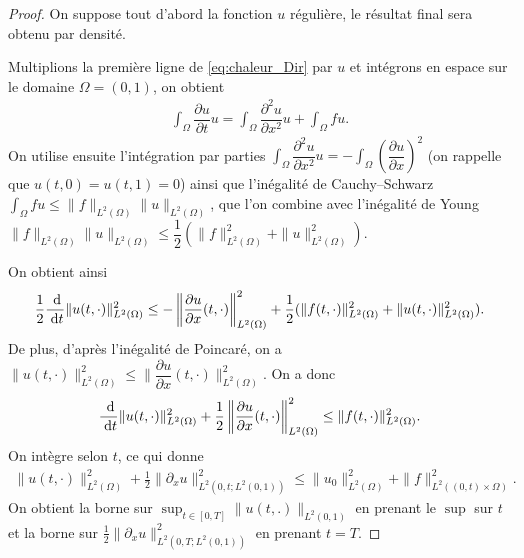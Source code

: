 \documentclass[12pt,a4paper,twoside]{article}
\begin{document}
\begin{proof}
  On suppose tout d'abord la fonction $u$ r\'eguli\`ere, le r\'esultat final
  sera obtenu par densit\'e.
  
  Multiplions la premi\`ere ligne de \eqref{eq:chaleur_Dir} par $u$
  et int\'egrons en espace sur le domaine $\Omega = (0,1)$,
  on obtient
  \begin{align*}
    \int_{\Omega} \dfrac{\partial u}{\partial t} u = \int_{\Omega} \dfrac{\partial^2 u}{\partial x^2} u 
    + \int_{\Omega} f u .
  \end{align*}
  On utilise ensuite l'int\'egration par parties 
  $\int_{\Omega} \dfrac{\partial^2 u}{\partial x^2} u  
  = - \int_{\Omega} \left(\dfrac{\partial u}{\partial x} \right)^2$
  (on rappelle que $u(t,0) = u(t,1) = 0$)
  ainsi que l'in\'egalit\'e de Cauchy--Schwarz 
  $\int_{\Omega} f u \leq \| f \|_{L^2(\Omega)} \| u \|_{L^2(\Omega)}$,
  que l'on combine avec l'in\'egalit\'e de Young 
  $\| f \|_{L^2(\Omega)} \| u \|_{L^2(\Omega)} \leq \dfrac{1}{2} (\| f \|_{L^2(\Omega)}^2 +  \| u \|_{L^2(\Omega)}^2)$.
  
  On obtient ainsi
  \begin{align*}
    \dfrac{1}{2} \dfrac{\;\mathrm{d}}{\;\mathrm{d} t} \| u(t,\cdot) \|_{L^2(\Omega)}^2
    \leq - \left\| \dfrac{\partial u}{\partial x} (t,\cdot) \right\|_{L^2(\Omega)}^2
    + \dfrac{1}{2}  (\| f (t,\cdot) \|_{L^2(\Omega)}^2 +  \| u (t,\cdot) \|_{L^2(\Omega)}^2) .
  \end{align*}
  De plus, d'apr\`es l'in\'egalit\'e de Poincar\'e, on a 
  $\| u (t,\cdot) \|_{L^2(\Omega)}^2 \leq \| \dfrac{\partial u}{\partial x} (t,\cdot) \|_{L^2(\Omega)}^2$.
  On a donc 
  \begin{align*}
    \dfrac{\;\mathrm{d}}{\;\mathrm{d} t} \| u(t,\cdot) \|_{L^2(\Omega)}^2
    + \frac12 \left\| \dfrac{\partial u}{\partial x} (t,\cdot) \right\|_{L^2(\Omega)}^2
    \leq \| f (t,\cdot) \|_{L^2(\Omega)}^2 .
  \end{align*}
  On int\`egre selon $t$, ce qui donne
  \begin{align*}
    \| u(t,\cdot) \|_{L^2(\Omega)}^2 + \frac12 \| \partial_x u \|_{L^2(0,t;L^2(0,1))}^2
    \leq \| u_0 \|_{L^2(\Omega)}^2 + \| f \|_{L^2((0,t) \times \Omega)}^2 .
  \end{align*}
  On obtient la borne sur $\sup_{t \in [0,T]} \| u(t,.) \|_{L^2(0,1)}$ en prenant le $\sup$ sur $t$
  et la borne sur $\frac12 \| \partial_x u \|_{L^2(0,T;L^2(0,1))}^2$ en prenant $t=T$.
\end{proof}
\end{document}
